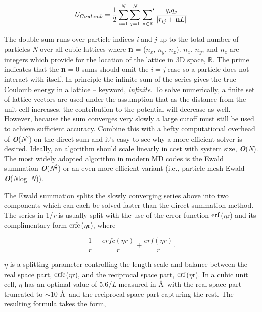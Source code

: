 \begin{theory}
  \begin{equation}\label{directsum}
      U_{Coulomb} = \frac{1}{2} \sum_{i=1}^{N} \sum_{j=1}^{N} \sideset{}{'}\sum_{\textbf{n} \in \mathbb{R}} 
      \frac{q_{i}q_{j}}{\left|r_{ij} + \textbf{n}L\right|}
  \end{equation}
  
  The double sum runs over particle indices \emph{i} and \emph{j} up to the total number of particles \emph{N}
  over all cubic lattices where \textbf{n} = ($n_{x}$, $n_{y}$, $n_{z}$). $n_{x}$, $n_{y}$, and $n_{z}$ are
  integers which provide for the location of the lattice in 3D space, $\mathbb{R}$. The prime indicates that the 
  \textbf{n} = 0 sums should omit the \emph{i} = \emph{j} case so a particle does not interact with itself. In 
  principle the infinite sum of the series gives the true Coulomb energy in a lattice -- keyword, \emph{infinite}.
  To solve numerically, a finite set of lattice vectors are used under the assumption that as the distance from 
  the unit cell increases, the contribution to the potential will decrease as well. However, because the sum 
  converges very slowly a large cutoff must still be used to achieve sufficient accuracy. Combine this with a 
  hefty computational overhead of \textbf{\emph{O}}(\emph{N}$^{2}$) on the direct sum and it's easy to see why 
  a more efficient solver is desired. Ideally, an algorithm should scale linearly in cost with system size, 
  \textbf{\emph{O}}(\emph{N}). The most widely adopted algorithm in modern MD codes is the Ewald summation 
  \textbf{\emph{O}}(\emph{N}$^{\frac{3}{2}}$) or an even more efficient variant (i.e., particle mesh Ewald
  \textbf{\emph{O}}(\emph{N}log~\emph{N})).
  
  The Ewald summation splits the slowly converging series above into two components which can each be solved
  faster than the direct summation method. The series in 1/\emph{r} is usually split with the use of the error
  function $\operatorname{erf}$($\eta$r) and its complimentary form $\operatorname{erfc}$($\eta$r), where
  
  \begin{equation}
      \frac{1}{r} = \frac{erfc(\eta r)}{r} + \frac{erf(\eta r)}{r}.
  \end{equation}
  
  \noindent $\eta$ is a splitting parameter controlling the length scale and balance between the real space
  part, $\operatorname{erfc}$($\eta$r), and the reciprocal space part, $\operatorname{erf}$($\eta$r). In a cubic unit cell, $\eta$
  has an optimal value of 5.6/\emph{L} measured in \AA~with the real space part truncated to $\sim$10 \AA~and
  the reciprocal space part capturing the rest. The resulting formula takes the form,
  

\end{theory}
